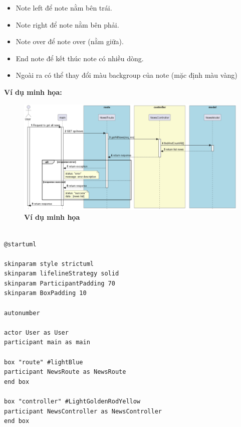 \begin{enumerate}[a)]
  
\begin{adjustwidth}{2em}{}
  \begin{itemize}

    \item Note left để note nằm bên trái.
    \item Note right để note nằm bên phải.
    \item Note over để note over (nằm giữa).
    \item End note để kết thúc note có nhiều dòng.
    \item	Ngoài ra có thể thay đổi màu backgroup của note (mặc định màu vàng)
    
    
  \end{itemize}
  \end{adjustwidth}

  \textbf{Ví dụ minh họa:}

  \begin{figure}[H]
    \centering
    \includegraphics[scale=0.42]{Images/server/sequence/server/getAllNews.png}
    \caption[Ví dụ minh họa]{\bfseries \fontsize{12pt}{0pt}
    \selectfont Ví dụ minh họa}
    \label{plantuml_object} %
  \end{figure}



\begin{lstlisting}

@startuml

skinparam style strictuml
skinparam lifelineStrategy solid
skinparam ParticipantPadding 70
skinparam BoxPadding 10

autonumber

actor User as User
participant main as main

box "route" #lightBlue
participant NewsRoute as NewsRoute
end box

box "controller" #LightGoldenRodYellow
participant NewsController as NewsController
end box


\end{lstlisting}
\end{enumerate}
